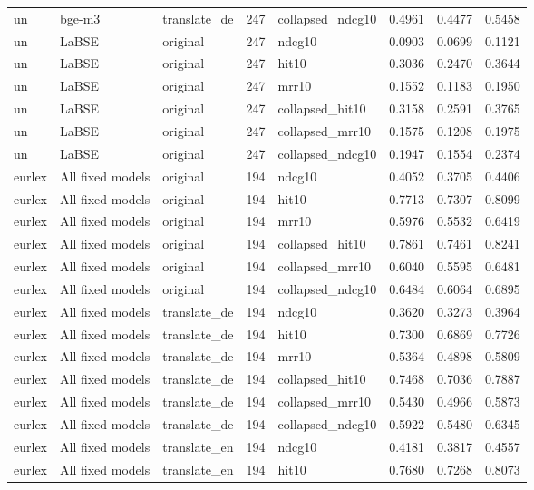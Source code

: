 \begin{tabular}{lllrlrrr}
un & bge-m3 & translate\_de & 247 & collapsed\_ndcg10 & 0.4961 & 0.4477 & 0.5458 \\
un & LaBSE & original & 247 & ndcg10 & 0.0903 & 0.0699 & 0.1121 \\
un & LaBSE & original & 247 & hit10 & 0.3036 & 0.2470 & 0.3644 \\
un & LaBSE & original & 247 & mrr10 & 0.1552 & 0.1183 & 0.1950 \\
un & LaBSE & original & 247 & collapsed\_hit10 & 0.3158 & 0.2591 & 0.3765 \\
un & LaBSE & original & 247 & collapsed\_mrr10 & 0.1575 & 0.1208 & 0.1975 \\
un & LaBSE & original & 247 & collapsed\_ndcg10 & 0.1947 & 0.1554 & 0.2374 \\
eurlex & All fixed models & original & 194 & ndcg10 & 0.4052 & 0.3705 & 0.4406 \\
eurlex & All fixed models & original & 194 & hit10 & 0.7713 & 0.7307 & 0.8099 \\
eurlex & All fixed models & original & 194 & mrr10 & 0.5976 & 0.5532 & 0.6419 \\
eurlex & All fixed models & original & 194 & collapsed\_hit10 & 0.7861 & 0.7461 & 0.8241 \\
eurlex & All fixed models & original & 194 & collapsed\_mrr10 & 0.6040 & 0.5595 & 0.6481 \\
eurlex & All fixed models & original & 194 & collapsed\_ndcg10 & 0.6484 & 0.6064 & 0.6895 \\
eurlex & All fixed models & translate\_de & 194 & ndcg10 & 0.3620 & 0.3273 & 0.3964 \\
eurlex & All fixed models & translate\_de & 194 & hit10 & 0.7300 & 0.6869 & 0.7726 \\
eurlex & All fixed models & translate\_de & 194 & mrr10 & 0.5364 & 0.4898 & 0.5809 \\
eurlex & All fixed models & translate\_de & 194 & collapsed\_hit10 & 0.7468 & 0.7036 & 0.7887 \\
eurlex & All fixed models & translate\_de & 194 & collapsed\_mrr10 & 0.5430 & 0.4966 & 0.5873 \\
eurlex & All fixed models & translate\_de & 194 & collapsed\_ndcg10 & 0.5922 & 0.5480 & 0.6345 \\
eurlex & All fixed models & translate\_en & 194 & ndcg10 & 0.4181 & 0.3817 & 0.4557 \\
eurlex & All fixed models & translate\_en & 194 & hit10 & 0.7680 & 0.7268 & 0.8073 \\

\end{tabular}
